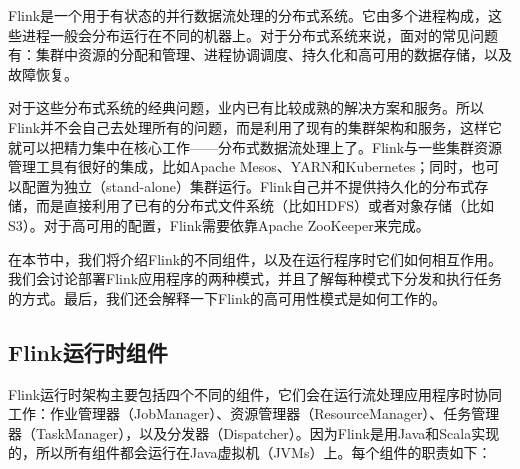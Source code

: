 \documentclass[cn,11pt,chinese]{elegantbook}
\begin{document}
Flink是一个用于有状态的并行数据流处理的分布式系统。它由多个进程构成，这些进程一般会分布运行在不同的机器上。对于分布式系统来说，面对的常见问题有：集群中资源的分配和管理、进程协调调度、持久化和高可用的数据存储，以及故障恢复。

对于这些分布式系统的经典问题，业内已有比较成熟的解决方案和服务。所以Flink并不会自己去处理所有的问题，而是利用了现有的集群架构和服务，这样它就可以把精力集中在核心工作------分布式数据流处理上了。Flink与一些集群资源管理工具有很好的集成，比如Apache
Mesos、YARN和Kubernetes；同时，也可以配置为独立（stand-alone）集群运行。Flink自己并不提供持久化的分布式存储，而是直接利用了已有的分布式文件系统（比如HDFS）或者对象存储（比如S3）。对于高可用的配置，Flink需要依靠Apache
ZooKeeper来完成。

在本节中，我们将介绍Flink的不同组件，以及在运行程序时它们如何相互作用。我们会讨论部署Flink应用程序的两种模式，并且了解每种模式下分发和执行任务的方式。最后，我们还会解释一下Flink的高可用性模式是如何工作的。

\hypertarget{flinkux8fd0ux884cux65f6ux7ec4ux4ef6}{%
\subsection{Flink运行时组件}\label{flinkux8fd0ux884cux65f6ux7ec4ux4ef6}}

Flink运行时架构主要包括四个不同的组件，它们会在运行流处理应用程序时协同工作：作业管理器（JobManager）、资源管理器（ResourceManager）、任务管理器（TaskManager），以及分发器（Dispatcher）。因为Flink是用Java和Scala实现的，所以所有组件都会运行在Java虚拟机（JVMs）上。每个组件的职责如下：
\end{document}
